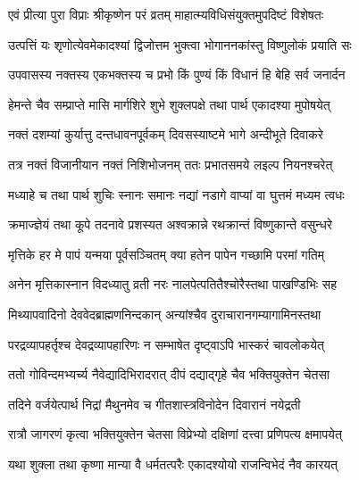 \label{sec:vrata-raja-margashirsha-krishna}


\twolineshloka
{एवं प्रीत्या पुरा विप्राः श्रीकृष्णेन परं व्रतम्}
{माहात्म्यविधिसंयुक्तमुपदिष्टं विशेषतः} %

\twolineshloka
{उत्पत्तिं यः शृणोत्येवमेकादश्यां द्विजोत्तम}
{भुक्त्वा भोगाननकांस्तु विष्णुलोकं प्रयाति सः} %


\twolineshloka
{उपवासस्य नक्तस्य एकभक्तस्य च प्रभो}
{किं पुण्यं किं विधानं हि बेहि सर्व जनार्दन} %


\twolineshloka
{हेमन्ते चैव सम्प्राप्ते मासि मार्गशिरे शुभे}
{शुक्लपक्षे तथा पार्थ एकादश्या मुपोषयेत्} %

\twolineshloka
{नक्तं दशम्यां कुर्यात्तु दन्तधावनपूर्वकम्}
{दिवसस्याष्टमे भागे अन्दीभूते दिवाकरे} %

\twolineshloka
{तत्र नक्तं विजानीयान नक्तं निशिभोजनम्}
{ततः प्रभातसमये लइल्प नियनश्चरेत्} %

\twolineshloka
{मध्याहे च तथा पार्थ शुचिः स्नानः समानः}
{नद्यां नडागे वाप्यां वा घुत्तमं मध्यम त्वधः} %

\twolineshloka
{क्रमाज्ज्ञेयं तथा कूपे तदनावे प्रशस्यत}
{अश्वक्रान्ने रथक्रान्तं विष्णुकान्ते वसुन्धरे} %

\twolineshloka
{मृत्तिके हर मे पापं यन्मया पूर्वसञ्चितम्}
{क्या हतेन पापेन गच्छामि परमां गतिम्} %

\twolineshloka
{अनेन मृत्तिकास्नान विदध्यातु व्रती नरः}
{नालपेत्पतितैश्चोरैस्तथा पाखण्डिभिः सह} %

\twolineshloka
{मिथ्यापवादिनो देववेदब्राह्मणनिन्दकान्}
{अन्यांश्चैव दुराचारानगम्यागामिनस्तथा} %

\twolineshloka
{परद्रव्यापहर्तृश्च देवद्रव्यापहारिणः}
{न सम्भाषेत दृष्ट्वाऽपि भास्करं चावलोकयेत्} %

\twolineshloka
{ततो गोविन्दमभ्यर्च्य नैवेद्यादिभिरादरात्}
{दीपं दद्याद्गृहे चैव भक्तियुक्तेन चेतसा} %

\twolineshloka
{तदिने वर्जयेत्पार्थ निद्रां मैथुनमेव च}
{गीतशास्त्रविनोदेन दिवारानं नयेद्रती} %

\twolineshloka
{रात्रौ जागरणं कृत्वा भक्तियुक्तेन चेतसा}
{विप्रेभ्यो दक्षिणां दत्त्वा प्रणिपत्य क्षमापयेत्} %

\twolineshloka
{यथा शुक्ला तथा कृष्णा मान्या वै धर्मतत्परैः}
{एकादश्योयो राजन्विभेदं नैव कारयत्} %

